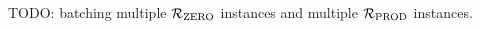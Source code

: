 \begin{remark}
    TODO: batching multiple ${\mathcal{R}}_{\text{ZERO}}$ instances and multiple ${\mathcal{R}}_{\text{PROD}}$ instances.
\end{remark}